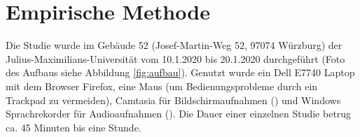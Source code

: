 \newpage
\section{Empirische Methode}

Die Studie wurde im Gebäude 52 (Josef-Martin-Weg 52, 97074 Würzburg) der Julius-Maximilians-Universität vom 10.1.2020 bis 20.1.2020 durchgeführt (Foto des Aufbaus siehe Abbildung \ref{fig:aufbau}). Genutzt wurde ein Dell E7740 Laptop mit dem Browser Firefox, eine Maus (um Bedienungsprobleme durch ein Trackpad zu vermeiden), Camtasia für Bildschirmaufnahmen (\cite{camtasia}) und Windows Sprachrekorder für Audioaufnahmen (\cite{windows}). Die Dauer einer einzelnen Studie betrug ca. 45 Minuten bis eine Stunde.










